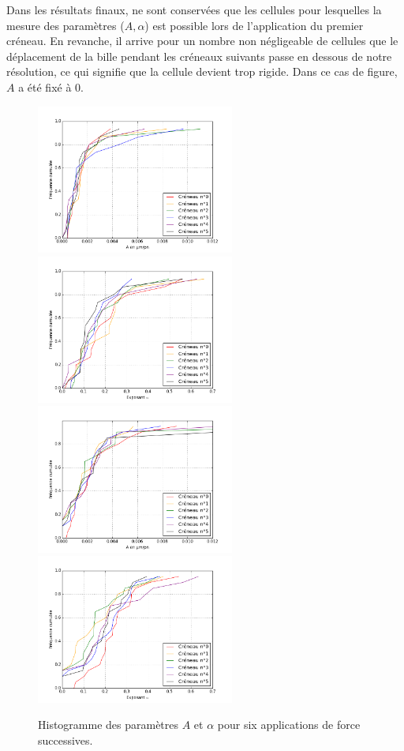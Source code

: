 Dans les résultats finaux, ne sont conservées que les cellules pour lesquelles la mesure des paramètres ($A, \alpha$) est possible lors de l'application du premier créneau. 
En revanche, il arrive pour un nombre non négligeable de cellules que le déplacement de la bille pendant les créneaux suivants passe en dessous de notre résolution, ce qui signifie que la cellule devient trop rigide. Dans ce cas de figure, $A$ a été fixé à 0. 
\begin{center}
\begin{figure}[p]
\includegraphics[width=6.5cm]{Figures/A_creneaux_temoin.png}
\includegraphics[width=6.5cm]{Figures/E_creneaux_temoin.png} 
\\
\includegraphics[width=6.5cm]{Figures/A_creneaux_S2.png} 
\includegraphics[width=6.5cm]{Figures/E_creneaux_S2.png} 
\caption{\label{Evolution_6c} Histogramme des paramètres $A$ et $\alpha$ pour six applications de force successives.}
\end{figure}
\end{center}
